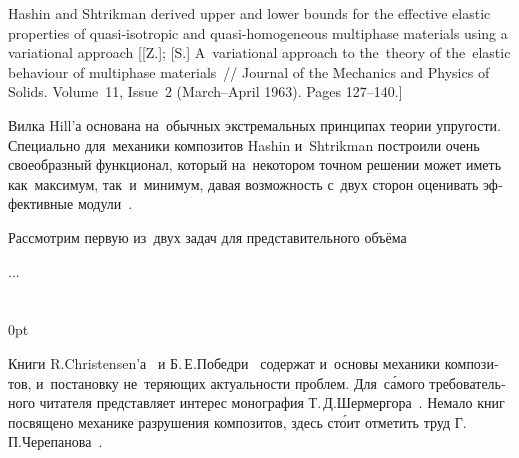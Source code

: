 

{\small \noindent Hashin and Shtrikman derived upper and lower bounds for the effective elastic properties of quasi-isotropic and quasi-homogeneous multiphase materials using a variational approach [[Z.]; [S.] A~variational approach to the~theory of the~elastic behaviour of multiphase materials~// Journal of the Mechanics and Physics of Solids. Volume~11, Issue~2 (March--April 1963). Pages 127\hbox{--}140.]
\par}

\begin{otherlanguage}{russian}

Вилка Hill’а основана на~обычных экстремальных принципах теории упругости. Специально для~механики композитов Hashin и~Shtrikman построили очень своеобразный функционал, который на~некотором точном решении может иметь как~максимум, так~и~минимум, давая возможность с~двух сторон оценивать эффективные модули~\cite{shermergor}.

Рассмотрим первую из~двух задач для представительного объёма

...



\end{otherlanguage}

\section*{\small \wordforbibliography}

\begin{changemargin}{\parindent}{0pt}
\fontsize{10}{12}\selectfont

\begin{otherlanguage}{russian}

Книги R.\:Christensen’а~\cite{christensen-compositematerials} и Б.\,Е.\:Победри~\cite{pobedrya-composites} содержат и~основы механики композитов, и~постановку не~теряющих актуальности проблем. Для~с\'{а}мого требовательного читателя представляет интерес монография Т.\,Д.\:Шермергора~\cite{shermergor}. Немало книг посвящено механике разрушения композитов, здесь ст\'{о}ит отметить труд Г.\,П.\:Черепанова~\cite{cherepanov-compositematerialfracture}.

\end{otherlanguage}

\end{changemargin}
